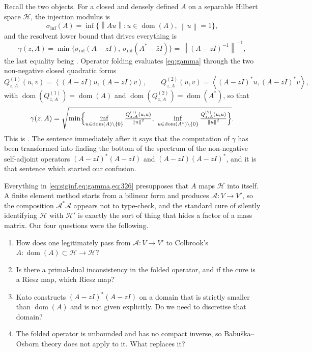 \documentclass[11pt,a4paper]{article}
\theoremstyle{plain}
\newcommand{\norm}[1]{\left\|#1\right\|}
\newcommand{\dual}[2]{\left\langle #1, #2 \right\rangle}
\newcommand{\Hb}{\mathcal{H}}
\newcommand{\Vb}{V}
\newcommand{\Aop}{\mathcal{A}}
\newcommand{\spec}{\sigma}
\DeclareMathOperator{\dom}{dom}
\newcommand{\siginf}{\spec_{\inf}}
\begin{document}
Recall the two objects.  For a closed and densely defined $A$ on a separable
Hilbert space $\Hb$, the injection modulus is
\begin{equation}
  \label{eq:siginf}
  \siginf(A) = \inf\{\norm{Au} : u \in \dom(A),\ \norm{u} = 1\},
\end{equation}
and the resolvent lower bound that drives everything is
\begin{equation}
  \label{eq:gamma}
  \gamma(z,A) = \min\bigl\{\siginf(A - zI),\ \siginf(A^* - \bar z I)\bigr\}
  = \norm{(A-zI)^{-1}}^{-1},
\end{equation}
the last equality being \cite[Lemma~1.2.5]{Colbrook2026}.  Operator folding
\cite[\S3.4.1, p.~114]{Colbrook2026} evaluates \cref{eq:gamma} through the two
non-negative closed quadratic forms
\begin{equation}
  \label{eq:colbrookforms}
  Q^{(1)}_{z,A}(u,v) = \dual{(A-zI)u}{(A-zI)v},\qquad
  Q^{(2)}_{z,A}(u,v) = \dual{(A-zI)^*u}{(A-zI)^*v},
\end{equation}
with $\dom(Q^{(1)}_{z,A}) = \dom(A)$ and $\dom(Q^{(2)}_{z,A}) = \dom(A^*)$, so
that
\begin{equation}
  \label{eq:326}
  \gamma(z,A) = \sqrt{\min\Bigl\{
     \inf_{u \in \dom(A)\setminus\{0\}} \tfrac{Q^{(1)}_{z,A}(u,u)}{\norm{u}^2},\
     \inf_{u \in \dom(A^*)\setminus\{0\}} \tfrac{Q^{(2)}_{z,A}(u,u)}{\norm{u}^2}
  \Bigr\}}.
\end{equation}
This is \cite[Equation~(3.26)]{Colbrook2026}.  The sentence immediately after it
says that the computation of $\gamma$ has been transformed into finding the
bottom of the spectrum of the non-negative self-adjoint operators
$(A-zI)^*(A-zI)$ and $(A-zI)(A-zI)^*$, and it is that sentence which started our
confusion.

Everything in \cref{eq:siginf,eq:gamma,eq:326} presupposes that $A$ maps $\Hb$
into itself.  A finite element method starts from a bilinear form and produces
$\Aop \colon \Vb \to \Vb'$, so the composition $\Aop^{*}\Aop$ appears not to
type-check, and the standard cure of silently identifying $\Hb$ with $\Hb'$ is
exactly the sort of thing that hides a factor of a mass matrix.  Our four
questions were the following.

\begin{enumerate}
  \item How does one legitimately pass from $\Aop \colon \Vb \to \Vb'$ to
        Colbrook's $A \colon \dom(A) \subset \Hb \to \Hb$?
  \item Is there a primal-dual inconsistency in the folded operator, and if
        the cure is a Riesz map, which Riesz map?
  \item Kato \cite[Theorem~V.3.24, p.~275]{Kato1995} constructs $(A-zI)^*(A-zI)$
        on a domain that is strictly smaller than $\dom(A)$ and is not given
        explicitly.  Do we need to discretise that domain?
  \item The folded operator is unbounded and has no compact inverse, so
        Babu\v{s}ka--Osborn theory \cite{BabuskaOsborn1991,Boffi2010} does not
        apply to it.  What replaces it?
\end{enumerate}
\end{document}
